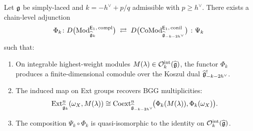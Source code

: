 \begin{theorem}
\label{thm:kl-bar-cobar-adjunction}
Let $\mathfrak{g}$ be simply-laced and $k = -h^\vee + p/q$ admissible with
$p \geq h^\vee$.  There exists a chain-level adjunction
\begin{equation}\label{eq:kl-bar-cobar-adjunction}
\Phi_k\colon
D\bigl(\mathrm{Mod}^{\mathsf{E}_1,\,\mathrm{compl}}_{\widehat{\mathfrak{g}}_k}\bigr)
\;\rightleftarrows\;
D\bigl(\mathrm{CoMod}^{\mathsf{E}_1,\,\mathrm{conil}}_{\widehat{\mathfrak{g}}_{-k-2h^\vee}}\bigr)
\;\colon \Psi_k
\end{equation}
such that:
\begin{enumerate}[label=\textup{(\roman*)}]
\item On integrable highest-weight modules $M(\lambda) \in
  \mathcal{O}_k^{\mathrm{int}}(\widehat{\mathfrak{g}})$, the functor $\Phi_k$
  produces a finite-dimensional comodule over the Koszul dual
  $\widehat{\mathfrak{g}}_{-k-2h^\vee}^!$.
\item The induced map on Ext groups recovers BGG multiplicities:
  \[
  \mathrm{Ext}^n_{\widehat{\mathfrak{g}}_k}(\omega_X, M(\lambda))
  \cong
  \mathrm{Coext}^n_{\widehat{\mathfrak{g}}_{-k-2h^\vee}}\!\bigl(\Phi_k(M(\lambda)),
  \Phi_k(\omega_X)\bigr).
  \]
\item The composition $\Psi_k \circ \Phi_k$ is quasi-isomorphic
  to the identity on $\mathcal{O}_k^{\mathrm{int}}(\widehat{\mathfrak{g}})$.
\end{enumerate}
\end{theorem}

